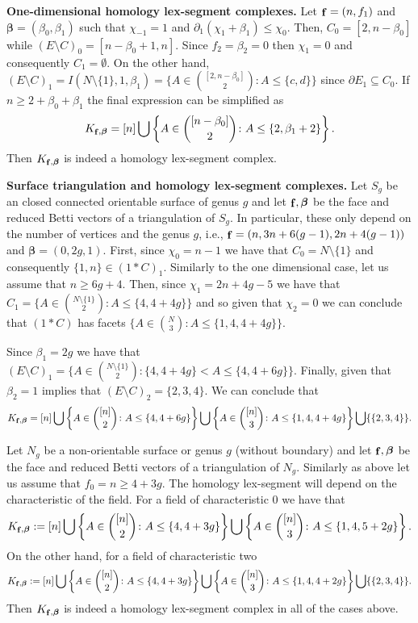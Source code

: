 \documentclass[reqno,english]{amsart}
\numberwithin{claimcounter}{theorem}
\theoremstyle{remark}
\theoremstyle{definition}
\numberwithin{theorem}{section}
\DeclareMathOperator{\fvec}{\bf f}
\newcommand{\bbeta}{\boldsymbol{\beta}}
\begin{document}
\noindent
{\bf One-dimensional homology lex-segment complexes.}
Let $\fvec=(n,f_1)$ and $\bbeta=(\beta_0,\beta_1)$ such that $\chi_{-1} = 1$ and $\partial_1(\chi_1+\beta_1)\leq \chi_0$.
Then, $C_0=[2,n-\beta_0]$ while $(E\setminus C)_0=[n-\beta_0+1,n]$.
Since $f_2=\beta_2=0$ then $\chi_1=0$ and consequently $C_1=\emptyset$. 
On the other hand, $(E\setminus C)_1 = I(N\setminus \{1\},1,\beta_1) = \{A \in \binom{[2,n-\beta_0]}{2} \colon A \leq \{c,d\}\}$ since $\partial E_1 \subseteq C_0$.
If $n \geq 2 + \beta_0 + \beta_1$ the final expression can be simplified as
\begin{equation}
  \label{eq:hseggraph}
  K_{\fvec,\bbeta} =  [n] \bigcup \left \{ A \in \binom{[n-\beta_0]}{2} \colon A \leq \{2,\beta_1+2\} \right \}.
\end{equation}
Then $K_{\fvec,\bbeta}$ is indeed a homology lex-segment complex.

\noindent
{\bf Surface triangulation and homology lex-segment complexes.}
Let $S_g$ be an closed connected orientable surface of genus $g$ and let $\fvec,\bbeta$ be the face and reduced Betti vectors of a triangulation of $S_g$. 
In particular, these only depend on the number of vertices and the genus $g$, i.e., $\fvec=(n,3n+6(g-1),2n+4(g-1))$ and $\bbeta=(0,2g,1)$.
First, since $\chi_0=n-1$ we have that $C_0=N\setminus \{1\}$ and consequently $\{1,n\}\in (1*C)_1$.
Similarly to the 
one dimensional case,
let us assume that $n\geq 6g+4$.
Then, since $\chi_1 = 2n+4g-5$ we have that $C_1 = \{A \in \binom{N\setminus \{1\}}{2} \colon A \leq \{4,4+4g\}\}$ and so given that $\chi_2=0$ we can conclude that $(1*C)$ has facets $\{A \in \binom{N}{3} \colon A \leq \{1,4,4+4g\}\}$.

Since $\beta_1=2g$ we have that $(E\setminus C)_1=\{A \in \binom{N\setminus \{1\}}{2}\colon \{4,4+4g\} < A \leq \{4,4+6g\}\}$. Finally, given that $\beta_2=1$ implies that $(E\setminus C)_2=\{2,3,4\}$. We can conclude that
\begin{equation}
\label{eq:hsegsrf}
K_{\fvec,\bbeta} = [n] \bigcup \left \{A \in \binom{[n]}{2}\colon A \leq \{4,4+6g\} \right \} \bigcup \left \{ A \in \binom{[n]}{3} \colon A \leq \{1,4,4+4g\} \right \} \bigcup \{\{2,3,4\}\}.
\end{equation}

Let $N_g$ be a non-orientable surface or genus $g$ (without boundary) and let $\fvec,\bbeta$ be the face and reduced Betti vectors of a triangulation of $N_g$.
Similarly as above let us assume that $f_0=n\geq 4+3g$.
The homology lex-segment will depend on the characteristic of the field. For a field of characteristic $0$ we have that
$$K_{\fvec,\bbeta}:= [n] \bigcup \left \{A \in \binom{[n]}{2}\colon A \leq \{4,4+3g\} \right \} \bigcup \left \{ A \in \binom{[n]}{3} \colon A \leq \{1,4,5+2g\} \right \}.$$
On the other hand, for a field of characteristic two
$$K_{\fvec,\bbeta}:= [n] \bigcup \left \{A\in \binom{[n]}{2}\colon A \leq \{4,4+3g\} \right \} \bigcup \left \{ A \in \binom{[n]}{3} \colon A \leq \{1,4,4+2g\} \right \} \bigcup \{\{2,3,4\}\}.$$
Then $K_{\fvec,\bbeta}$ is indeed a homology lex-segment complex in all of the cases above.
\end{document}
